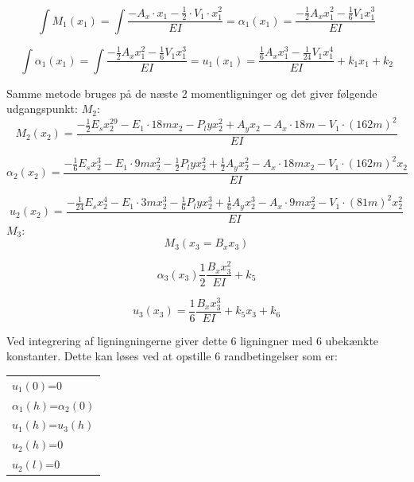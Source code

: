  
\begin{equation}
	\int M_1(x_1) = \int \frac{- A_x\cdot x_1 - \frac{1}{2}\cdot V_1 \cdot x_1^2}{EI}
	= \alpha_1(x_1) = \frac{-\frac{1}{2} A_x x_1^2 - \frac{1}{6}  V_1  x_1^3 }{EI}
\end{equation}

\begin{equation}
	\int \alpha_1(x_1) = \int \frac{-\frac{1}{2} A_x x_1^2 - \frac{1}{6}  V_1  x_1^3 }{EI}
	= u_1(x_1) = \frac{\frac{1}{6} A_x x_1^3 - \frac{1}{24}  V_1  x_1^4 }{EI} + k_1 x_1 + k_2
\end{equation}

Samme metode bruges på de næste 2 momentligninger og det giver følgende udgangspunkt: 
\newline
$M_2$:
\begin{equation}
M_2(x_2) = \frac{- \frac{1}{2}E_s x_2^29 - E_1 \cdot 18m x_2 - P_ly x_2^2 + A_y x_2 - A_x \cdot 18m - V_1 \cdot (162m)^2}{EI}
\end{equation}
	
	\begin{equation}
	\alpha_2(x_2) = \frac{-\frac{1}{6}E_s x_2^3 - E_1 \cdot 9m x_2^2 - \frac{1}{2} P_ly x_2^2 + \frac{1}{2} A_y x_2^2 - A_x \cdot 18m x_2 - V_1 \cdot (162m)^2 x_2 }{EI}
	\end{equation}
	
	\begin{equation}
	u_2(x_2) = \frac{-\frac{1}{24}E_s x_2^4 - E_1 \cdot 3m x_2^3 - \frac{1}{6} P_ly x_2^3 + \frac{1}{6} A_y x_2^3 - A_x \cdot 9m x_2^2 - V_1 \cdot (81m)^2 x_2^2 }{EI}
	\end{equation} 
$M_3$:
\begin{equation}
M_3(x_3 = B_x x_3)
\end{equation}

\begin{equation}
\alpha_3 (x_3) \frac{1}{2}\frac{B_x x_3^2}{EI} + k_5
\end{equation}

\begin{equation}
u_3(x_3) = \frac{1}{6} \frac{B_x x_3^3}{EI} + k_5 x_3 + k_6
\end{equation}

Ved integrering af ligningningerne giver dette 6 ligningner med 6 ubekænkte konstanter. Dette kan løses ved at opstille 6 randbetingelser som er: 

\begin{table}[h]
	\begin{tabular}{l}
		$u_1(0)$=0       \\
		$\alpha_1(h)$=$\alpha_2(0)$ \\
		$u_1(h)$=$u_3(h)$ \\
		$u_2(h)$=0       \\
		$u_2(l)$=0       \\
		
	\end{tabular}
\end{table}

